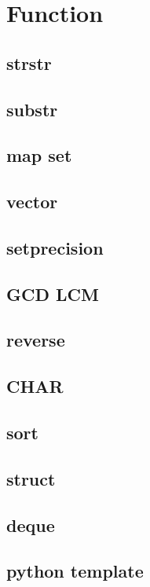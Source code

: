 \section{Function}
        \subsection{strstr}
                
        \subsection{substr}
                
        \subsection{map set}
                
        \subsection{vector}
                
        \subsection{setprecision}
                
        \subsection{GCD LCM}
                
        \subsection{reverse}
                
        \subsection{CHAR}
                
        \subsection{sort}
                
        \subsection{struct}
                
        \subsection{deque}
                
        \subsection{python template}
                    